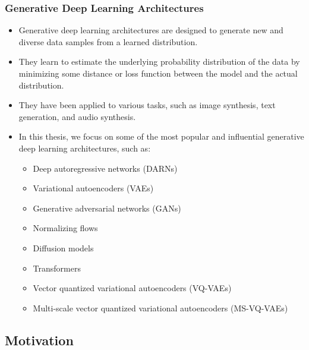 \begin{frame}
    \frametitle{Generative Deep Learning Architectures}
    \begin{itemize}
        \item Generative deep learning architectures are designed to generate new and diverse data samples from a learned distribution.
        \item They learn to estimate the underlying probability distribution of the data by minimizing some distance or loss function between the model and the actual distribution.
        \item They have been applied to various tasks, such as image synthesis, text generation, and audio synthesis.
        \item In this thesis, we focus on some of the most popular and influential generative deep learning architectures, such as:
              \begin{itemize}
                  \item Deep autoregressive networks (DARNs)
                  \item Variational autoencoders (VAEs)
                  \item Generative adversarial networks (GANs)
                  \item Normalizing flows
                  \item Diffusion models
                  \item Transformers
                  \item Vector quantized variational autoencoders (VQ-VAEs)
                  \item Multi-scale vector quantized variational autoencoders (MS-VQ-VAEs)
              \end{itemize}
    \end{itemize}
\end{frame}

\subsection{Motivation}

